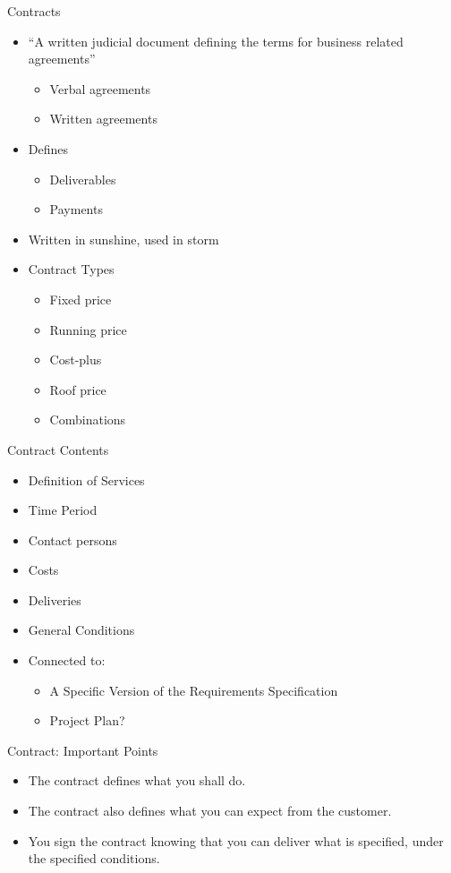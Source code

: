 \documentclass[10pt,t,a4paper]{beamer}
\begin{document}
\begin{frame}[label=sec-1-17]{Contracts}
\begin{itemize}
\item “A written judicial document defining the terms for business related agreements”
\begin{itemize}
\item Verbal agreements
\item Written agreements
\end{itemize}

\item Defines
\begin{itemize}
\item Deliverables
\item Payments
\end{itemize}

\item Written in sunshine, used in storm

\item Contract Types
\begin{itemize}
\item Fixed price
\item Running price
\item Cost-plus
\item Roof price
\item Combinations
\end{itemize}
\end{itemize}
\end{frame}
\begin{frame}[label=sec-1-18]{Contract Contents}
\begin{itemize}
\item Definition of Services
\item Time Period
\item Contact persons
\item Costs
\item Deliveries
\item General Conditions

\item Connected to:
\begin{itemize}
\item A Specific Version of the Requirements Specification
\item Project Plan?
\end{itemize}
\end{itemize}
\end{frame}
\begin{frame}[label=sec-1-19]{Contract: Important Points}
\begin{itemize}
\item The contract defines what you shall do.
\item The contract also defines what you can expect from the customer.
\item You sign the contract knowing that you can deliver what is specified, under the specified conditions.
\end{itemize}
\end{frame}
\end{document}
